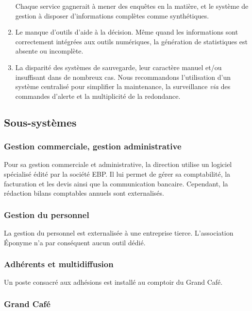 \begin{enumerate}
      Chaque service gagnerait à mener des enquêtes en la matière, et le système de gestion
      à disposer d'informations complètes comme synthétiques.
\item Le manque d'outils d'aide à la décision. Même quand les informations sont correctement
      intégrées aux outils numériques, la génération de statistiques est absente ou
      incomplète.
\item La disparité des systèmes de sauvegarde, leur caractère manuel et/ou insuffisant
      dans de nombreux cas.
      Nous recommandons l'utilisation d'un système centralisé pour simplifier la maintenance,
      la surveillance \textit{via} des commandes d'alerte et la multiplicité de la redondance.
\end{enumerate}


\subsection{Sous-systèmes}

\subsubsection{Gestion commerciale, gestion administrative}

Pour sa gestion commerciale et administrative, la direction utilise un logiciel spécialisé
 édité par la société EBP.
Il lui permet de gérer sa comptabilité, la facturation et les devis ainsi que la
communication bancaire. Cependant, la rédaction bilans comptables annuels sont externalisés.

\subsubsection{Gestion du personnel}

La gestion du personnel est externalisée à une entreprise tierce.
L'association Éponyme n'a par conséquent aucun outil dédié.


\subsubsection{Adhérents et multidiffusion}

Un poste consacré aux adhésions est installé au comptoir du Grand Café.

\subsubsection{Grand Café}

